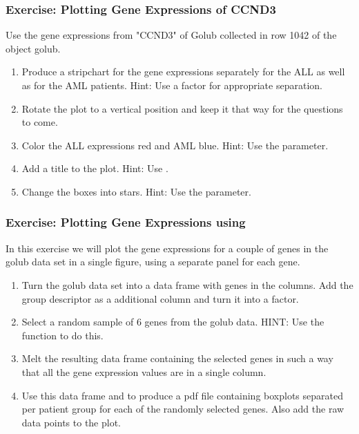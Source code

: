\documentclass{article}\usepackage[]{graphicx}\usepackage[usenames,dvipsnames]{color}
\begin{document}
\subsubsection*{Exercise: Plotting Gene Expressions of CCND3}
Use the gene expressions from "CCND3" of Golub collected in row
1042 of the object golub.
\begin{enumerate}[label=(\emph{\alph*})]

\item  Produce a  stripchart for the gene expressions separately
for the ALL as well as for the AML patients. Hint: Use a factor
for appropriate separation.
\item  Rotate the plot to a vertical position and keep it that way for the
questions to come.
\item  Color the ALL expressions red and AML blue. Hint: Use the 
parameter.
\item  Add a title to the plot. Hint: Use .
\item   Change the boxes into stars. Hint: Use the  parameter.
\end{enumerate}

\subsubsection*{Exercise: Plotting Gene Expressions using }
In this exercise we will plot the gene expressions for a couple
of genes in the golub data set in a single figure, using a separate 
panel for each gene.

\begin{enumerate}[label=(\emph{\alph*})]
\item Turn the golub data set into a 
data frame with genes in the columns. Add the
group descriptor  as a additional
column and turn it into a factor.

\item Select a random sample of 6 genes from the golub
data. HINT: Use the function  to do this.

\item Melt the resulting data frame containing the selected genes
in such a way that all the gene expression values are in 
a single column.

\item Use this data frame and  to produce
a pdf file containing boxplots separated per patient group for each
of the randomly selected genes. Also add the raw data points 
to the plot.
\end{enumerate}
\end{document}
